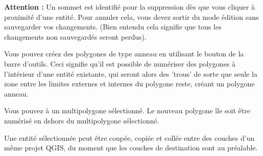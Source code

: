 \begin{itemize}
\textbf{Attention :} Un sommet est identifié pour la suppression dès que vous cliquer à proximité d'une entité. Pour annuler cela, vous devez sortir du mode édition sans sauvegarder vos changements. (Bien entendu cela signifie que tous les changements non sauvegardés seront perdus).


Vous pouvez créez des polygones de type anneau en utilisant le bouton  de la barre d'outils. Ceci signifie qu'il est possible de numériser des polygones à l'intérieur d'une entité existante, qui seront alors des 'trous' de sorte que seule la zone entre les limites externes et internes du polygone reste, créant un polygone anneau.



Vous pouvez  à un multipolygone sélectionné. Le nouveau polygone île soit être numérisé en dehors du multipolygone sélectionné.


Une entité sélectionnée peut être coupée, copiée et collée entre des couches d'un même projet QGIS, du moment que les couches de destination sont  au préalable.


\end{itemize}
